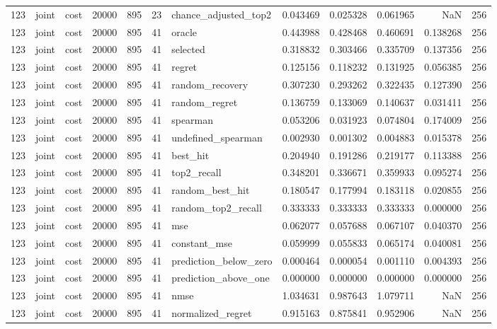 \begin{tabular}{rllrrrlrrrrr}
123 & joint & cost & 20000 & 895 & 23 & chance_adjusted_top2 & 0.043469 & 0.025328 & 0.061965 & NaN & 256 \\
123 & joint & cost & 20000 & 895 & 41 & oracle & 0.443988 & 0.428468 & 0.460691 & 0.138268 & 256 \\
123 & joint & cost & 20000 & 895 & 41 & selected & 0.318832 & 0.303466 & 0.335709 & 0.137356 & 256 \\
123 & joint & cost & 20000 & 895 & 41 & regret & 0.125156 & 0.118232 & 0.131925 & 0.056385 & 256 \\
123 & joint & cost & 20000 & 895 & 41 & random_recovery & 0.307230 & 0.293262 & 0.322435 & 0.127390 & 256 \\
123 & joint & cost & 20000 & 895 & 41 & random_regret & 0.136759 & 0.133069 & 0.140637 & 0.031411 & 256 \\
123 & joint & cost & 20000 & 895 & 41 & spearman & 0.053206 & 0.031923 & 0.074804 & 0.174009 & 256 \\
123 & joint & cost & 20000 & 895 & 41 & undefined_spearman & 0.002930 & 0.001302 & 0.004883 & 0.015378 & 256 \\
123 & joint & cost & 20000 & 895 & 41 & best_hit & 0.204940 & 0.191286 & 0.219177 & 0.113388 & 256 \\
123 & joint & cost & 20000 & 895 & 41 & top2_recall & 0.348201 & 0.336671 & 0.359933 & 0.095274 & 256 \\
123 & joint & cost & 20000 & 895 & 41 & random_best_hit & 0.180547 & 0.177994 & 0.183118 & 0.020855 & 256 \\
123 & joint & cost & 20000 & 895 & 41 & random_top2_recall & 0.333333 & 0.333333 & 0.333333 & 0.000000 & 256 \\
123 & joint & cost & 20000 & 895 & 41 & mse & 0.062077 & 0.057688 & 0.067107 & 0.040370 & 256 \\
123 & joint & cost & 20000 & 895 & 41 & constant_mse & 0.059999 & 0.055833 & 0.065174 & 0.040081 & 256 \\
123 & joint & cost & 20000 & 895 & 41 & prediction_below_zero & 0.000464 & 0.000054 & 0.001110 & 0.004393 & 256 \\
123 & joint & cost & 20000 & 895 & 41 & prediction_above_one & 0.000000 & 0.000000 & 0.000000 & 0.000000 & 256 \\
123 & joint & cost & 20000 & 895 & 41 & nmse & 1.034631 & 0.987643 & 1.079711 & NaN & 256 \\
123 & joint & cost & 20000 & 895 & 41 & normalized_regret & 0.915163 & 0.875841 & 0.952906 & NaN & 256 \\

\end{tabular}
